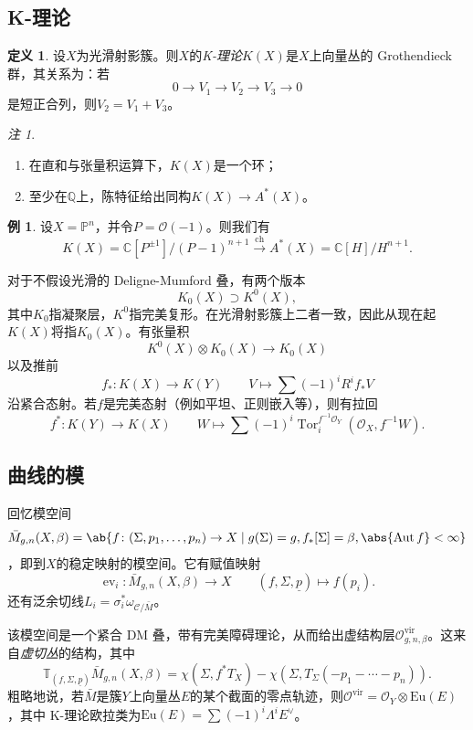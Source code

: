 \documentclass{amsart}
\theoremstyle{definition}
\newtheorem{defn}[thm]{定义}
\newtheorem{exm}[thm]{例}
\theoremstyle{remark}
\newtheorem{rmk}[thm]{注}
\theoremstyle{plain}
\theoremstyle{definition}
\theoremstyle{remark}
\newcommand{\C}{\mathbb{C}}
\newcommand{\Q}{\mathbb{Q}}
\renewcommand{\P}{\mathbb{P}}
\newcommand{\mc}[1]{\mathcal{#1}}
\newcommand{\mr}[1]{\mathrm{#1}}
\newcommand{\on}[1]{\operatorname{#1}}
\newcommand{\ul}[1]{\underline{#1}}
\newcommand{\1}{\mathbf{1}}
\newcommand{\2}{\mathbf{2}}
\newcommand{\3}{\mathbf{3}}
\newcommand{\vir}{\mr{vir}}
\DeclareMathOperator{\Aut}{Aut}
\DeclareMathOperator{\ev}{ev}
\begin{document}
\subsection{K-理论}%
\label{sub:K-theory}

\begin{defn}
    设\(X\)为光滑射影簇。则\(X\)的\textit{K-理论}\(K(X)\)是\(X\)上向量丛的 Grothendieck 群，其关系为：若
    \[ 0 \to V_1 \to V_2 \to V_3 \to 0 \]
    是短正合列，则\(V_2 = V_1 + V_3\)。
\end{defn}

\begin{rmk}\leavevmode
    \begin{enumerate}
        \item 在直和与张量积运算下，\(K(X)\)是一个环；
        \item 至少在\(\Q\)上，陈特征给出同构\(K(X) \to A^*(X)\)。
    \end{enumerate}
\end{rmk}

\begin{exm}
    设\(X = \P^n\)，并令\(P = \mc{O}(-1)\)。则我们有
    \[ K(X) = \C[P^{\pm 1}]/(P-1)^{n+1} \xrightarrow{\on{ch}} A^*(X) = \C[H]/H^{n+1}. \]
\end{exm}

对于不假设光滑的 Deligne-Mumford 叠，有两个版本
\[ K_0(X) \supset K^0(X), \]
其中\(K_0\)指凝聚层，\(K^0\)指完美复形。在光滑射影簇上二者一致，因此从现在起\(K(X)\)将指\(K_0(X)\)。有张量积
\[ K^0(X) \otimes K_0(X) \to K_0(X) \]
以及推前
\[ f_* \colon K(X) \to K(Y) \qquad V \mapsto \sum (-1)^i R^i f_* V \]
沿紧合态射。若\(f\)是完美态射（例如平坦、正则嵌入等），则有拉回
\[ f^* \colon K(Y) \to K(X) \qquad W \mapsto \sum (-1)^i \on{Tor}_i^{f^{-1} \mc{O}_Y} (\mc{O}_X, f^{-1} W). \]

\subsection{曲线的模}%
\label{sub:Moduli of curves}

回忆模空间
\[ \bar{M}_{g,n}(X, \beta) = \ab\{ f \colon (\Sigma, p_1, \ldots, p_n) \to X \mid g(\Sigma) = g, f_*[\Sigma] = \beta, \abs{\Aut f} < \infty \} \]
，即到\(X\)的稳定映射的模空间。它有赋值映射
\[ \ev_i \colon \bar{M}_{g,n}(X, \beta) \to X \qquad (f, \Sigma, \ul{p}) \mapsto f(p_i). \]
还有泛余切线\(L_i = \sigma_i^* \omega_{ \mc{C}/\bar{M} }\)。

该模空间是一个紧合 DM 叠，带有完美障碍理论，从而给出虚结构层\(\mc{O}^{\vir}_{g,n,\beta}\)。这来自\textit{虚切丛}的结构，其中
\[ \mathbb{T}_{(f, \Sigma, \ul{p})} \bar{M}_{g,n}(X, \beta) = \chi(\Sigma, f^* T_X) - \chi(\Sigma, T_{\Sigma}(-p_1 - \cdots - p_n)). \]
粗略地说，若\(\bar{M}\)是簇\(Y\)上向量丛\(E\)的某个截面的零点轨迹，则\(\mc{O}^{\vir} = \mc{O}_Y \otimes \mr{Eu}(E)\)，其中 K-理论欧拉类为\(\mr{Eu}(E) = \sum (-1)^i \Lambda^i E^{\vee}\)。
\end{document}

